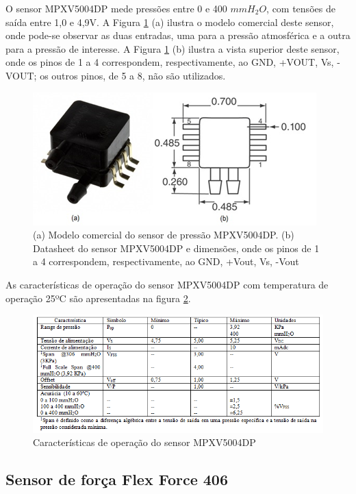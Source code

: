 O sensor MPXV5004DP mede pressões entre 0 e 400 $mmH_{2}O$, com tensões de saída entre 1,0 e 4,9V. A Figura \ref{sensor1} (a) ilustra o modelo comercial deste sensor, onde pode-se observar as duas entradas, uma para a pressão atmosférica e a outra para a pressão de interesse. A Figura \ref{sensor1} (b) ilustra a vista superior deste sensor, onde os pinos de 1 a 4 correspondem, respectivamente, ao GND, +VOUT, Vs, -VOUT; os outros pinos, de 5 a 8, não são utilizados.

\begin{figure}[htb]
		\centering
			\includegraphics[scale=1.0]{figuras/sensor1.png}
		\caption{(a) Modelo comercial do sensor de pressão MPXV5004DP. (b) Datasheet do sensor MPXV5004DP e dimensões, onde os pinos de 1 a 4 correspondem, respectivamente, ao GND, +Vout, Vs, -Vout \cite{sensor1}}
		\label{sensor1}
\end{figure}

As características de operação do sensor MPXV5004DP com temperatura de operação 25ºC são apresentadas na figura \ref{caractsensor1}.

\begin{figure}[htb]
		\centering
			\includegraphics[scale=0.8]{figuras/caractsensor1.png}
		\caption{Características de operação do sensor MPXV5004DP \cite{sensor1} }
		\label{caractsensor1}
\end{figure}

\subsection[Sensor de força Flex Force 406]{Sensor de força Flex Force 406}

